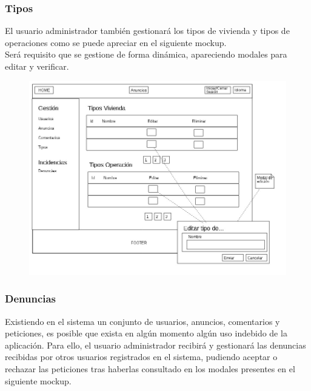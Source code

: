 \pagebreak

\subsubsection{Tipos}
El usuario administrador tambi\'{e}n gestionar\'{a} los tipos de vivienda y tipos de operaciones como se puede apreciar en el siguiente mockup.\\

Ser\'{a} requisito que se gestione de forma din\'{a}mica, apareciendo modales para editar y verificar. 
\begin{figure}[h]
\centering
\includegraphics[width=1\textwidth]{Img/VisionAplicacion/vision_12.jpg}
\end{figure}

\pagebreak

\subsubsection{Denuncias}

Existiendo en el sistema un conjunto de usuarios, anuncios, comentarios y peticiones, es posible que exista en alg\'{u}n momento alg\'{u}n uso indebido de la aplicaci\'{o}n. Para ello, el usuario administrador recibir\'{a} y gestionar\'{a} las denuncias recibidas por otros usuarios registrados en el sistema, pudiendo aceptar o rechazar las peticiones tras haberlas consultado en los modales presentes en el siguiente mockup.

